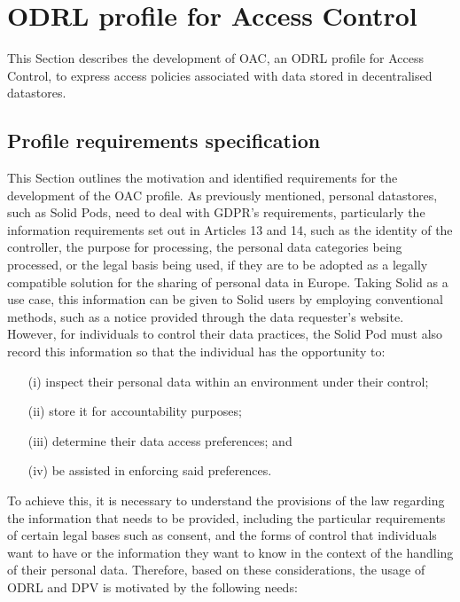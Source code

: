 \section{ODRL profile for Access Control}
\label{sec:oac}

This Section describes the development of OAC, an ODRL profile for Access Control, to express access policies associated with data stored in decentralised datastores.

\subsection{Profile requirements specification}
\label{sec:oac_requirements}

This Section outlines the motivation and identified requirements for the development of the OAC profile.
As previously mentioned, personal datastores, such as Solid Pods, need to deal with GDPR's requirements, particularly the information requirements set out in Articles 13 and 14, such as the identity of the controller, the purpose for processing, the personal data categories being processed, or the legal basis being used, if they are to be adopted as a legally compatible solution for the sharing of personal data in Europe.
Taking Solid as a use case, this information can be given to Solid users by employing conventional methods, such as a notice provided through the data requester's website.
However, for individuals to control their data practices, the Solid Pod must also record this information so that the individual has the opportunity to:

\begin{enumerate}
    \item [(i)] inspect their personal data within an environment under their control;
    \item [(ii)] store it for accountability purposes;
    \item [(iii)] determine their data access preferences; and
    \item [(iv)] be assisted in enforcing said preferences.
\end{enumerate}

To achieve this, it is necessary to understand the provisions of the law regarding the information that needs to be provided, including the particular requirements of certain legal bases such as consent, and the forms of control that individuals want to have or the information they want to know in the context of the handling of their personal data.
Therefore, based on these considerations, the usage of ODRL and DPV is motivated by the following needs: 

